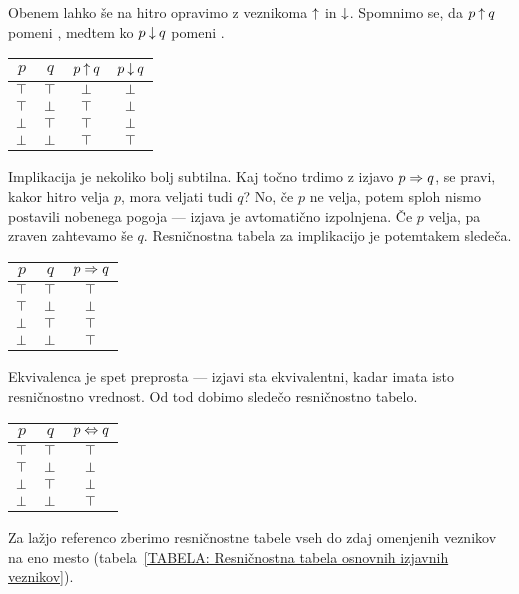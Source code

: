 		Obenem lahko še na hitro opravimo z veznikoma $\mathbin{\uparrow}$ in $\mathbin{\downarrow}$. Spomnimo se, da $p \mathbin{\uparrow} q$ pomeni , medtem ko $p \mathbin{\downarrow} q$ pomeni .
		\begin{center}
			\begin{tabular}{cc|cc}
				$p$ & $q$ & $p \mathbin{\uparrow} q$ & $p \mathbin{\downarrow} q$ \\
				\hline
				$\top$ & $\top$ & $\bot$ & $\bot$ \\
				$\top$ & $\bot$ & $\top$ & $\bot$ \\
				$\bot$ & $\top$ & $\top$ & $\bot$ \\
				$\bot$ & $\bot$ & $\top$ & $\top$
			\end{tabular}
		\end{center}
		
		Implikacija je nekoliko bolj subtilna. Kaj točno trdimo z izjavo $p \Rightarrow q$, se pravi, kakor hitro velja $p$, mora veljati tudi $q$? No, če $p$ ne velja, potem sploh nismo postavili nobenega pogoja --- izjava je avtomatično izpolnjena. Če $p$ velja, pa zraven zahtevamo še $q$. Resničnostna tabela za implikacijo je potemtakem sledeča.
		\begin{center}
			\begin{tabular}{cc|c}
				$p$ & $q$ & $p \Rightarrow q$ \\
				\hline
				$\top$ & $\top$ & $\top$ \\
				$\top$ & $\bot$ & $\bot$ \\
				$\bot$ & $\top$ & $\top$ \\
				$\bot$ & $\bot$ & $\top$
			\end{tabular}
		\end{center}
		
		Ekvivalenca je spet preprosta --- izjavi sta ekvivalentni, kadar imata isto resničnostno vrednost. Od tod dobimo sledečo resničnostno tabelo.
		\begin{center}
			\begin{tabular}{cc|c}
				$p$ & $q$ & $p \Leftrightarrow q$ \\
				\hline
				$\top$ & $\top$ & $\top$ \\
				$\top$ & $\bot$ & $\bot$ \\
				$\bot$ & $\top$ & $\bot$ \\
				$\bot$ & $\bot$ & $\top$
			\end{tabular}
		\end{center}
		
		Za lažjo referenco zberimo resničnostne tabele vseh do zdaj omenjenih veznikov na eno mesto (tabela~\ref{TABELA: Resničnostna tabela osnovnih izjavnih veznikov}).
		
